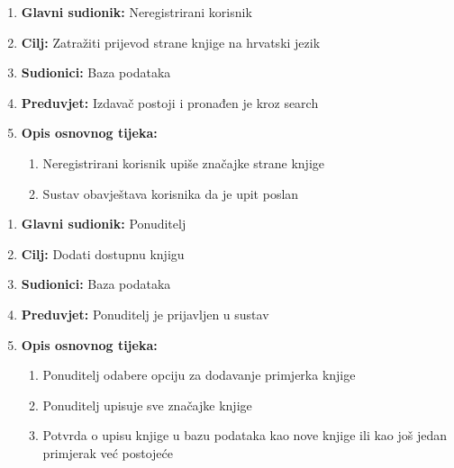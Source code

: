 \noindent {}
\begin{enumerate}
	
	\item \textbf{Glavni sudionik: } Neregistrirani korisnik
	\item  \textbf{Cilj:} Zatražiti prijevod strane knjige na hrvatski jezik
	\item  \textbf{Sudionici:} Baza podataka
	\item  \textbf{Preduvjet:} Izdavač postoji i pronađen je kroz search
	\item  \textbf{Opis osnovnog tijeka:}
	
	\begin{enumerate}
	 
		\item Neregistrirani korisnik upiše značajke strane knjige
		\item Sustav obavještava korisnika da je upit poslan
		
	\end{enumerate}
	
\end{enumerate}

\noindent {}
\begin{enumerate}
	
	\item \textbf{Glavni sudionik: } Ponuditelj
	\item  \textbf{Cilj:} Dodati dostupnu knjigu 
	\item  \textbf{Sudionici:} Baza podataka
	\item  \textbf{Preduvjet:} Ponuditelj je prijavljen u sustav
	\item  \textbf{Opis osnovnog tijeka:}
	
	\begin{enumerate}
		
		\item Ponuditelj odabere opciju za dodavanje primjerka knjige
		\item Ponuditelj upisuje sve značajke knjige   
		\item Potvrda o upisu knjige u bazu podataka kao nove knjige ili kao još jedan primjerak već postojeće
		
	\end{enumerate}
	
\end{enumerate}

